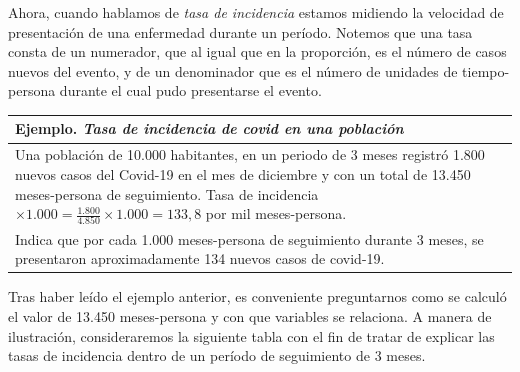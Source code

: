 \documentclass[
]{book}
\begin{document}
Ahora, cuando hablamos de \emph{tasa de incidencia} estamos midiendo la velocidad de presentación de una enfermedad durante un período. Notemos que una tasa consta de un numerador, que al igual que en la proporción, es el número de casos nuevos del evento, y de un denominador que es el número de unidades de tiempo-persona durante el cual pudo presentarse el evento.

\begin{longtable}[]{@{}l@{}}
\toprule
\begin{minipage}[b]{0.97\columnwidth}\raggedright
Ejemplo. \emph{Tasa de incidencia de covid en una población}\strut
\end{minipage}\tabularnewline
\midrule
\endhead
\begin{minipage}[t]{0.97\columnwidth}\raggedright
Una población de 10.000 habitantes, en un periodo de 3 meses registró 1.800 nuevos casos del Covid-19 en el mes de diciembre y con un total de 13.450 meses-persona de seguimiento. Tasa de incidencia \(\times 1.000=\frac{1.800}{4.850}\times 1.000=133,8\) por mil meses-persona.\strut
\end{minipage}\tabularnewline
\begin{minipage}[t]{0.97\columnwidth}\raggedright
Indica que por cada 1.000 meses-persona de seguimiento durante 3 meses, se presentaron aproximadamente 134 nuevos casos de covid-19.\strut
\end{minipage}\tabularnewline
\bottomrule
\end{longtable}

Tras haber leído el ejemplo anterior, es conveniente preguntarnos como se calculó el valor de 13.450 meses-persona y con que variables se relaciona. A manera de ilustración, consideraremos la siguiente tabla con el fin de tratar de explicar las tasas de incidencia dentro de un período de seguimiento de 3 meses.
\end{document}
